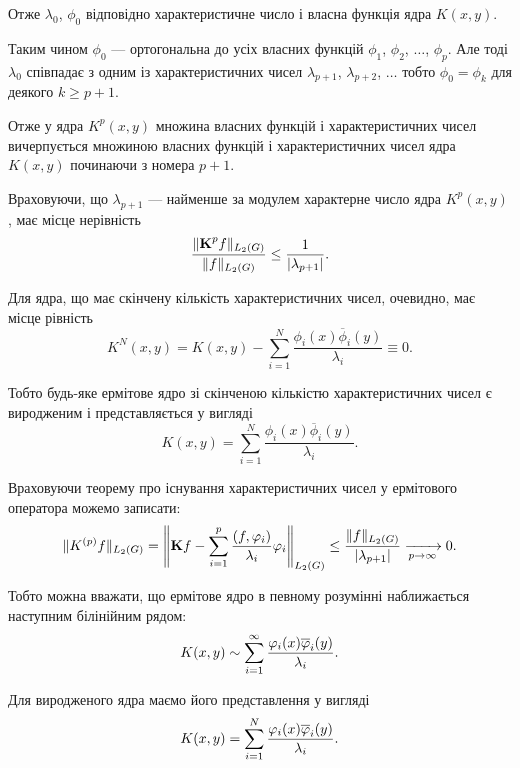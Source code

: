 Отже $\lambda_0$, $\phi_0$ відповідно характеристичне число і власна функція ядра $K(x, y)$. \medskip

Таким чином $\phi_0$ --- ортогональна до усіх власних функцій $\phi_1$, $\phi_2$, $\ldots$, $\phi_p$. Але тоді $\lambda_0$ співпадає з одним із характеристичних чисел $\lambda_{p + 1}$, $\lambda_{p + 2}$, $\ldots$ тобто $\phi_0 = \phi_k$ для деякого $k \ge p + 1$. \medskip

Отже у ядра $K^p(x, y)$ множина власних функцій і характеристичних чисел вичерпується множиною власних функцій і характеристичних чисел ядра $K(x, y)$ починаючи з номера $p + 1$. \medskip

Враховуючи, що $\lambda_{p + 1}$ --- найменше за модулем характерне число ядра $K^p(x, y)$, має місце нерівність
\begin{equation}
    \dfrac{\|\bf{K}^p f\|_{L_2(G)}}{\|f\|_{L_2(G)}} \le \dfrac{1}{|\lambda_{p + 1}|}.
\end{equation}

Для ядра, що має скінчену кількість характеристичних чисел, очевидно, має місце рівність
\begin{equation}
    K^N(x, y) = K(x, y) - \sum_{i = 1}^N \frac{\phi_i(x) \overline \phi_i(y)}{\lambda_i} \equiv 0.
\end{equation}

Тобто будь-яке ермітове ядро зі скінченою кількістю характеристичних чисел є виродженим і представляється у вигляді
\begin{equation}
    K(x, y) = \sum_{i = 1}^N \frac{\phi_i(x) \overline \phi_i(y)}{\lambda_i}.
\end{equation}

Враховуючи теорему про існування характеристичних чисел у ермітового оператора можемо записати:
\begin{equation}
    \| K^{(p)} f \|_{L_2(G)} = \left\| \bf{K}f - \Sum_{i = 1}^p \dfrac{(f, \phi_i)}{\lambda_i} \phi_i \right\|_{L_2(G)} \le \dfrac{\|f\|_{L_2(G)}}{|\lambda_{p + 1}|} \xrightarrow[p\to\infty]{} 0.
\end{equation}

Тобто можна вважати, що ермітове ядро в певному розумінні наближається наступним білінійним рядом:
\begin{equation}
    K(x, y) \sim \Sum_{i = 1}^\infty \dfrac{\phi_i(x) \overline \phi_i(y)}{\lambda_i}.
\end{equation}

Для виродженого ядра маємо його представлення у вигляді
\begin{equation}
    K(x, y) = \Sum_{i = 1}^N \dfrac{\phi_i(x) \overline \phi_i(y)}{\lambda_i}.
\end{equation}

